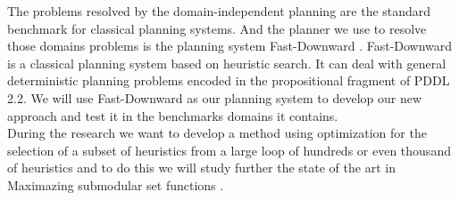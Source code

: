 \documentclass[a4paper,12pt]{article}
\begin{document}
The problems resolved by the domain-independent planning are the standard benchmark for classical planning systems. And the planner we use to resolve those domains problems is the planning system Fast-Downward \citep{helmert2006fast}. Fast-Downward is a classical planning system based on heuristic search. It can deal with general deterministic planning problems encoded in the propositional fragment of PDDL 2.2. We will use Fast-Downward as our planning system to develop our new approach and test it in the benchmarks domains it contains.\\

During the research we want to develop a method using optimization for the selection of a subset of heuristics from a large loop of hundreds or even thousand of heuristics and to do this we will study further the state of the art in Maximazing submodular set functions \citep{nemhauser1978analysis}.\\
\newpage
\end{document}
